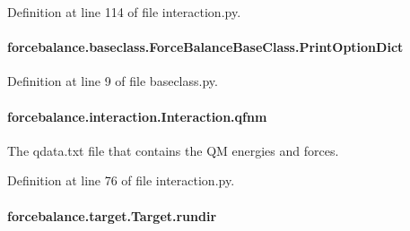 Definition at line 114 of file interaction.\-py.

\hypertarget{classforcebalance_1_1baseclass_1_1ForceBalanceBaseClass_a5c55e661e746d1a4443f4e0bc34ebe05}{
\paragraph[{Print\-Option\-Dict}]{\setlength{\rightskip}{0pt plus 5cm}forcebalance.\-baseclass.\-Force\-Balance\-Base\-Class.\-Print\-Option\-Dict\hspace{0.3cm}{\ttfamily [inherited]}}}\label{classforcebalance_1_1baseclass_1_1ForceBalanceBaseClass_a5c55e661e746d1a4443f4e0bc34ebe05}


Definition at line 9 of file baseclass.\-py.

\hypertarget{classforcebalance_1_1interaction_1_1Interaction_a6b49404cbea9c353fc4b97506ff143c6}{
\paragraph[{qfnm}]{\setlength{\rightskip}{0pt plus 5cm}forcebalance.\-interaction.\-Interaction.\-qfnm\hspace{0.3cm}{\ttfamily [inherited]}}}\label{classforcebalance_1_1interaction_1_1Interaction_a6b49404cbea9c353fc4b97506ff143c6}


The qdata.\-txt file that contains the Q\-M energies and forces. 



Definition at line 76 of file interaction.\-py.

\hypertarget{classforcebalance_1_1target_1_1Target_a6872de5b2d4273b82336ea5b0da29c9e}{
\paragraph[{rundir}]{\setlength{\rightskip}{0pt plus 5cm}forcebalance.\-target.\-Target.\-rundir\hspace{0.3cm}{\ttfamily [inherited]}}}\label{classforcebalance_1_1target_1_1Target_a6872de5b2d4273b82336ea5b0da29c9e}


